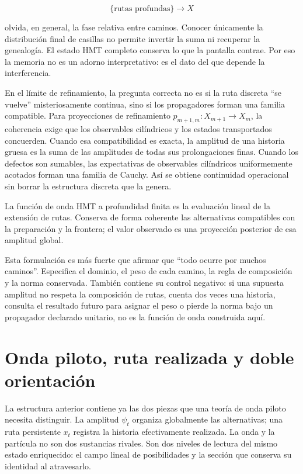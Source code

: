 \[
  \{\text{rutas profundas}\}\longrightarrow X
\]

olvida, en general, la fase relativa entre caminos. Conocer únicamente la
distribución final de casillas no permite invertir la suma ni recuperar la
genealogía. El estado HMT completo conserva lo que la pantalla contrae. Por eso la
memoria no es un adorno interpretativo: es el dato del que depende la interferencia.

En el límite de refinamiento, la pregunta correcta no es si la ruta discreta
``se vuelve'' misteriosamente continua, sino si los propagadores forman una familia
compatible. Para proyecciones de refinamiento \(p_{m+1,m}:X_{m+1}\to X_m\), la
coherencia exige que los observables cilíndricos y los estados transportados
concuerden. Cuando esa compatibilidad es exacta, la amplitud de una historia gruesa
es la suma de las amplitudes de todas sus prolongaciones finas. Cuando los defectos
son sumables, las expectativas de observables cilíndricos uniformemente acotados
forman una familia de Cauchy. Así se obtiene continuidad operacional sin borrar la
estructura discreta que la genera.

\begin{principle}
La función de onda HMT a profundidad finita es la evaluación lineal de la extensión
de rutas. Conserva de forma coherente las alternativas compatibles con la
preparación y la frontera; el valor observado es una proyección posterior de esa
amplitud global.
\end{principle}

Esta formulación es más fuerte que afirmar que ``todo ocurre por muchos caminos''.
Especifica el dominio, el peso de cada camino, la regla de composición y la norma
conservada. También contiene su control negativo: si una supuesta amplitud no
respeta la composición de rutas, cuenta dos veces una historia, consulta el
resultado futuro para asignar el peso o pierde la norma bajo un propagador
declarado unitario, no es la función de onda construida aquí.

\section{Onda piloto, ruta realizada y doble orientación}

La estructura anterior contiene ya las dos piezas que una teoría de onda piloto
necesita distinguir. La amplitud \(\psi_t\) organiza globalmente las alternativas;
una ruta persistente \(x_t\) registra la historia efectivamente realizada. La onda
y la partícula no son dos sustancias rivales. Son dos niveles de lectura del mismo
estado enriquecido: el campo lineal de posibilidades y la sección que conserva su
identidad al atravesarlo.

